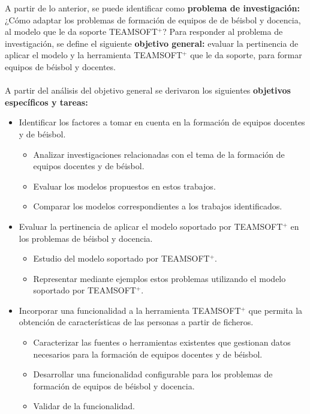 A partir de lo anterior, se puede identificar como \textbf{problema de investigación:} ¿Cómo adaptar los problemas de formación de equipos de de béisbol y docencia, al modelo que le da soporte TEAMSOFT$^+$? Para responder al problema de investigación, se define el siguiente \textbf{objetivo general:} evaluar la pertinencia de aplicar el modelo y la herramienta TEAMSOFT$^+$ que le da soporte, para formar equipos de béisbol y docentes.\\\\
A partir del análisis del objetivo general se derivaron los siguientes \textbf{objetivos específicos y tareas:}
\begin{itemize}		
	\item Identificar los factores a tomar en cuenta en la formación de equipos docentes y de béisbol.
		\begin{itemize}
			\item Analizar investigaciones relacionadas con el tema de la formación de equipos docentes y de béisbol.
			\item Evaluar los modelos propuestos en estos trabajos.
			\item Comparar los modelos correspondientes a los trabajos identificados.
		\end{itemize}
	
	\item Evaluar la pertinencia de aplicar el modelo soportado por TEAMSOFT$^+$ en los problemas de béisbol y docencia.
		\begin{itemize}
			\item Estudio del modelo soportado por TEAMSOFT$^+$.
			\item Representar mediante ejemplos estos problemas utilizando el modelo soportado por TEAMSOFT$^+$.
		\end{itemize}
		
	\item Incorporar una funcionalidad a la herramienta TEAMSOFT$^+$ que permita la obtención de características de las personas a partir de ficheros.
		\begin{itemize}
			\item Caracterizar las fuentes o herramientas existentes que gestionan datos necesarios para la formación de equipos docentes y de béisbol.
			\item Desarrollar una funcionalidad configurable para los problemas de formación de equipos de béisbol y docencia.
			\item Validar de la funcionalidad.
		\end{itemize}
\end{itemize}


